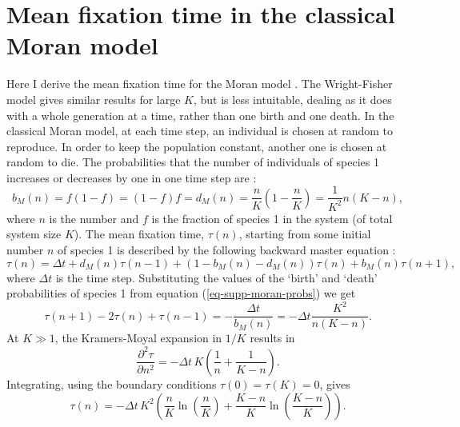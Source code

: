 \section{Mean fixation time in the classical Moran model}
Here I derive the mean fixation time for the Moran model \cite{Moran1962}. 
The Wright-Fisher model gives similar results for large $K$, but is less intuitable, dealing as it does with a whole generation at a time, rather than one birth and one death. %
In the classical Moran model, at each time step, an individual is chosen at random to reproduce. In order to keep the population constant, another one is chosen at random to die. %
The probabilities that the number of individuals of species 1 increases or decreases by one  in one time step are \cite{Moran1962}:
\begin{equation}
b_{M}(n) = f(1-f) = (1-f)f = d_{M}(n) = \frac{n}{K}\left(1-\frac{n}{K}\right) = \frac{1}{K^2}n(K-n),
\label{eq-supp-moran-probs}
\end{equation}
where $n$ is the number and $f$ is the fraction of species 1 in the system (of total system size $K$). 
The mean fixation time, $\tau(n)$, starting from some initial number $n$ of species 1 is described by the following backward master equation \cite{Nisbet1982}:
\begin{equation*}
\tau(n) = \Delta t + d_{M}(n)\tau(n-1) + \left(1-b_{M}(n)-d_{M}(n)\right)\tau(n) + b_{M}(n)\tau(n+1),
\end{equation*}
where $\Delta t$ is the time step. 
Substituting the values of the `birth' and `death' probabilities of species 1 from equation (\ref{eq-supp-moran-probs}) we get
\begin{equation*}
\tau(n+1) - 2\tau(n) + \tau(n-1) = -\frac{\Delta t}{b_{M}(n)} = -\Delta t\frac{K^2}{n(K-n)}.
\end{equation*}
At $K\gg 1$, the Kramers-Moyal expansion in $1/K$ results in
\begin{equation*}
\frac{\partial^2\tau}{\partial n^2} = -\Delta t\,K\left(\frac{1}{n}+\frac{1}{K-n}\right).
\end{equation*}
Integrating, using the boundary conditions  $\tau(0) = \tau(K)=0$, gives
\begin{equation}
\tau(n) = -\Delta t\,K^2\left(\frac{n}{K}\ln\left(\frac{n}{K}\right)+\frac{K-n}{K}\ln\left(\frac{K-n}{K}\right)\right).
\end{equation}\label{Morantime}
